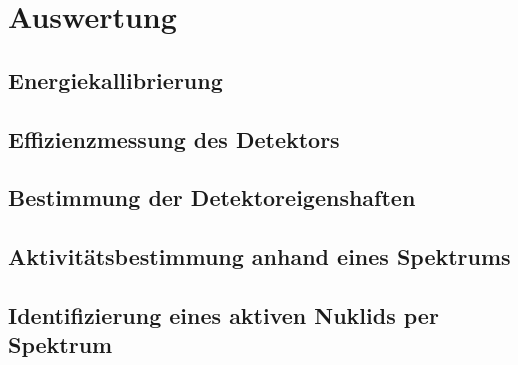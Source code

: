 \newpage
\section{Auswertung}
\label{sec:Auswertung}

\subsection{Energiekallibrierung}
\label{sec:Energiekallibrierung}

\subsection{Effizienzmessung des Detektors}
\label{sec:Effizienzmessung}

\subsection{Bestimmung der Detektoreigenshaften}
\label{sec:Detektoreigenschaften}

\subsection{Aktivitätsbestimmung anhand eines Spektrums}
\label{sec:Aktivitätsbestimmung}

\subsection{Identifizierung eines aktiven Nuklids per Spektrum}
\label{sec:Nuklidbestimmung}


